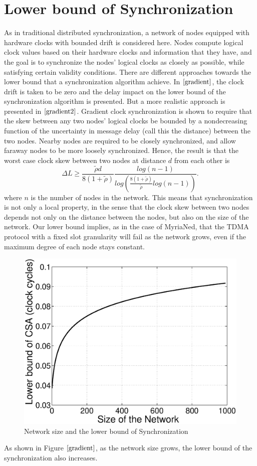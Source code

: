 \documentclass[a4paper,10pt]{report}
\begin{document}
\section{\textbf{Lower bound of Synchronization}}
As in traditional distributed synchronization, a network of nodes equipped with hardware clocks with bounded drift is considered
here. Nodes compute logical clock values based on their hardware clocks and information that they have, and the goal is to
synchronize the nodes' logical clocks as closely as possible, while satisfying certain validity conditions. \newline
There are different approaches towards the lower bound that a synchronization algorithm achieve. In $\cite{gradient}$, the clock drift is taken to be zero and the delay impact on the lower bound of the synchronization algorithm is presented. But a more realistic approach is presented in $\cite{gradient2}$. Gradient clock synchronization is shown to require that the skew between any two nodes' logical clocks be
bounded by a nondecreasing function of the uncertainty in message delay (call this the distance) between the two nodes. Nearby nodes
are required to be closely synchronized, and allow faraway nodes to be more loosely synchronized. Hence, the result is that the worst
case clock skew between two nodes at distance $d$ from each other is 
\begin{equation}
\Delta L \geq \frac{\tilde \rho d}{8(1+\tilde \rho)}\frac{log(n-1)}{log(\frac{8(1+\tilde \rho)}{\tilde \rho}log(n-1))}.
\end{equation}
where $n$ is the number of nodes in the network. This means that synchronization is not only a local property, in the sense that the clock skew between two nodes depends not only on the distance between the nodes, but also on the size of the network. \newline
Our lower bound implies, as in the case of MyriaNed, that the TDMA protocol with a fixed slot granularity will fail as the network grows, even if the maximum degree of each node stays constant.
\begin{figure}
\centering
\includegraphics[width=0.5 \textwidth]{lowerbound}
\caption{Network size and the lower bound of Synchronization}
\label{gradient}
\end{figure}
As shown in Figure $\ref{gradient}$, as the network size grows, the lower bound of the synchronization also increases.
\end{document}
